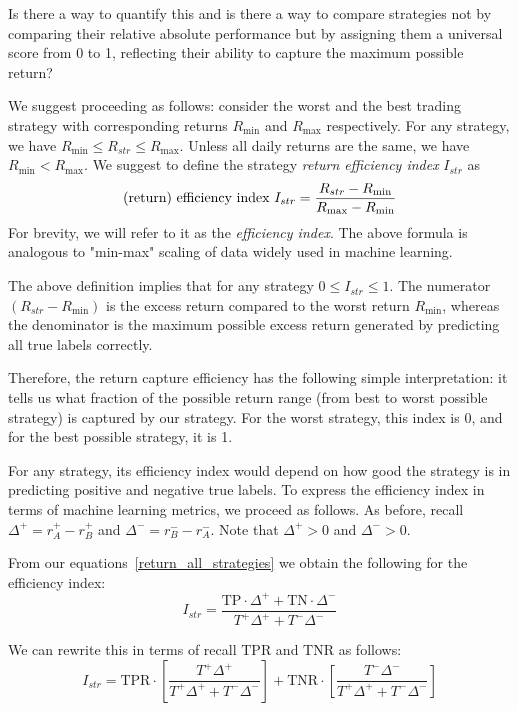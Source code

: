 \documentclass{article}
\begin{document}
Is there a way to quantify this and is there a way to compare strategies not by comparing their relative absolute performance but by assigning them a universal score from 0 to 1, reflecting their ability to capture the maximum possible return?

We suggest proceeding as follows: consider the worst and the best trading strategy with corresponding returns
$R_{\min}$ and $R_{\max}$ respectively. For any strategy, we have $R_{\min}\leq R_{str} \leq R_{\max}$. Unless all daily returns are the same, we
have $R_{\min} < R_{\max}$. We suggest to define the strategy {\it return efficiency index} $I_{str}$ as
\begin{equation}
\hbox{(return) efficiency index } I_{str} =\frac{R_{str}-R_{\min}}{R_{\max}-R_{\min}}
\end{equation}
For brevity, we will refer to it as the {\it efficiency index}. The above formula is analogous to 
"min-max" scaling of data widely used in machine learning.

The above definition implies that for any strategy
$0\leq I_{str}\leq 1$. The numerator $(R_{str}-R_{\min})$ is the excess return compared to the worst return $R_{\min}$, whereas the denominator is the maximum possible excess return generated by predicting all true labels correctly. 

Therefore, the return capture efficiency has the following simple interpretation: it tells us what fraction of the possible return range (from best to worst possible strategy) is captured by our strategy. For the worst strategy, this index is 0, and for the best possible strategy, it is 1. 

For any strategy, its efficiency index would depend on how good the strategy is in predicting positive and negative true labels. To express the efficiency index in terms of machine learning metrics, we proceed as follows. 
As before, recall $\Delta^{+}=r_{A}^{+}-r_{B}^{+}$ and
$\Delta^{-}=r_{B}^{-}-r_{A}^{-}$. Note that $\Delta^{+}>0$ and $\Delta^{-}>0$.

From our  equations~\eqref{return_all_strategies} we obtain the following for the efficiency  index:
\begin{equation}
I_{str} = \frac{\text{TP}\cdot \Delta^{+} +\text{TN}\cdot \Delta^{-}}
{T^{+} \Delta^{+} + T^{-}\Delta^{-}}
\label{accuracy_index_delta}
\end{equation}

We can rewrite this in terms of recall $\text{TPR}$ and
$\text{TNR}$ as follows:
\begin{equation}
I_{str} = \text{TPR} \cdot \left[\frac{T^{+}\Delta^{+} }
{T^{+} \Delta^{+} + T^{-}\Delta^{-}}\right] 
+ \text{TNR} \cdot \left[ 
\frac{T^{-} \Delta^{-}}
{T^{+} \Delta^{+} + T^{-}\Delta^{-}} \right]
\label{accuracy_index_as_sum}
\end{equation}
\end{document}
